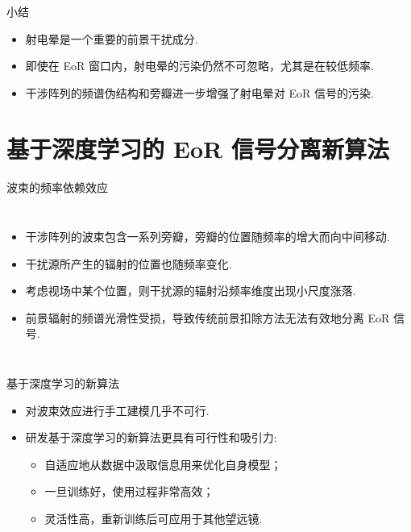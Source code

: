 \documentclass{beamer}
\begin{document}
\begin{frame}{小结}
  \begin{itemize}
    \item 射电晕是一个重要的前景干扰成分.
    \item 即使在 EoR 窗口内，射电晕的污染仍然不可忽略，尤其是在较低频率.
    \item 干涉阵列的频谱伪结构和旁瓣进一步增强了射电晕对 EoR 信号的污染.
  \end{itemize}
\end{frame}


\section{基于深度学习的 EoR 信号分离新算法}

\begin{frame}{波束的频率依赖效应}
  \begin{columns}
    \begin{itemize}
      \item 干涉阵列的波束包含一系列旁瓣，旁瓣的位置随频率的增大而向中间移动.
      \item 干扰源所产生的辐射的位置也随频率变化.
      \item 考虑视场中某个位置，则干扰源的辐射沿频率维度出现小尺度涨落.
      \item 前景辐射的频谱光滑性受损，导致传统前景扣除方法无法有效地分离 EoR 信号.
    \end{itemize}

  \end{columns}
\end{frame}

\begin{frame}{基于深度学习的新算法}
  \begin{itemize}
    \item 对波束效应进行手工建模几乎不可行.
    \item 研发基于\alert{深度学习}的新算法更具有可行性和吸引力:
      \begin{itemize}
        \item 自适应地从数据中汲取信息用来优化自身模型；
        \item 一旦训练好，使用过程非常高效；
        \item 灵活性高，重新训练后可应用于其他望远镜.
      \end{itemize}
  \end{itemize}
\end{frame}
\end{document}

